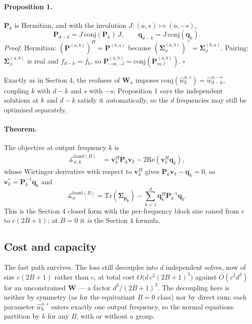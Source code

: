 \paragraph{Proposition 1.} $\mathbf{P}_{k}$ is Hermitian, and with the involution
$J:(a,s)\mapsto(a,-s)$,
\[
\mathbf{P}_{d-k}=J\,\text{conj}(\mathbf{P}_{k})\,J,
\qquad
\mathbf{q}_{d-k}=J\,\text{conj}(\mathbf{q}_{k}).
\]
\emph{Proof.} Hermitian: $(\boldsymbol{P}^{(a,b)})^{H}=\boldsymbol{P}^{(b,a)}$ because
$(\boldsymbol{\Sigma}^{(a,b)}_{\phi})^{\top}=\boldsymbol{\Sigma}^{(b,a)}_{\phi}$.
Pairing: $\boldsymbol{\Sigma}^{(a,b)}_{\phi}$ is real and $f_{d-k}=\overline{f_{k}}$,
so $\boldsymbol{P}^{(a,b)}_{-m,-l}=\text{conj}(\boldsymbol{P}^{(a,b)}_{m,l})$. $\square$

Exactly as in Section 4, the realness of $\boldsymbol{W}_{a}$ imposes
$\text{conj}(\hat{w}^{a,s}_{k})=\hat{w}^{a,-s}_{d-k}$, coupling $k$ with $d-k$ and $s$
with $-s$; Proposition 1 says the independent solutions at $k$ and $d-k$ satisfy it
automatically, so the $d$ frequencies may still be optimised separately.

\paragraph{Theorem.} The objective at output frequency $k$ is
\begin{align*}
\mathcal{L}^{\text{band}(B)}_{\sigma,k}
 & =\boldsymbol{v}^{H}_{k}\mathbf{P}_{k}\boldsymbol{v}_{k}-2\text{Re}(\boldsymbol{v}^{H}_{k}\mathbf{q}_{k}),
\end{align*}
whose Wirtinger derivative with respect to $\boldsymbol{v}^{H}_{k}$ gives
$\mathbf{P}_{k}\boldsymbol{v}_{k}-\mathbf{q}_{k}=0$, so
$\boldsymbol{v}^{*}_{k}=\mathbf{P}^{-1}_{k}\mathbf{q}_{k}$ and
\[
\boxed{\ \mathcal{L}^{\text{band}(B)}_{\sigma}
=\text{Tr}(\boldsymbol{\Sigma}_{\boldsymbol{p_{0}}})-\sum^{d}_{k=1}\mathbf{q}^{H}_{k}\mathbf{P}^{-1}_{k}\mathbf{q}_{k}.\ }
\]
This is the Section 4 closed form with the per-frequency block size raised from $c$ to
$c(2B+1)$; at $B=0$ it \emph{is} the Section 4 formula.

\subsection{Cost and capacity}

The fast path survives. The loss still decouples into $d$ independent solves, now of
size $c(2B+1)$ rather than $c$, at total cost $O\!\big(d\,c^{3}(2B+1)^{3}\big)$ against
$O(c^{3}d^{3})$ for an unconstrained $\boldsymbol{W}$ --- a factor $d^{2}/(2B+1)^{3}$.
The decoupling here is neither by symmetry (as for the equivariant $B=0$ class) nor by
direct sum: each parameter $\hat{w}^{a,s}_{k}$ enters exactly one output frequency, so
the normal equations partition by $k$ for any $B$, with or without a group.

